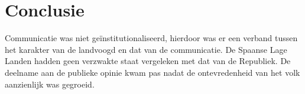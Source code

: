\documentclass[11pt]{amsart}
\begin{document}
\section*{Conclusie}
Communicatie was niet geïnstitutionaliseerd, hierdoor was er een verband tussen het karakter van de landvoogd en dat
van de communicatie. De Spaanse Lage Landen hadden geen verzwakte staat vergeleken met dat van de Republiek. De
deelname aan de publieke opinie kwam pas nadat de ontevredenheid van het volk aanzienlijk was gegroeid.

\newpage\printbibliography{}
\end{document}
